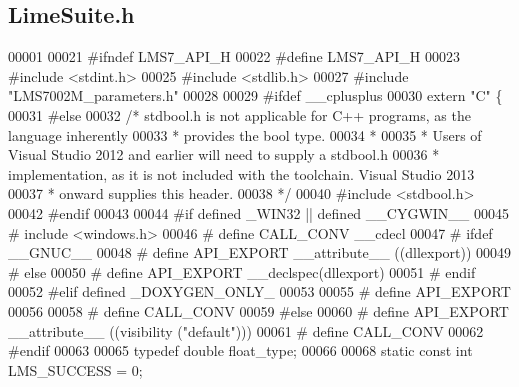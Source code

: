 \subsection{Lime\+Suite.\+h}
\label{LimeSuite_8h_source}

\begin{DoxyCode}
00001 
00021 \textcolor{preprocessor}{#ifndef LMS7\_API\_H}
00022 \textcolor{preprocessor}{#define LMS7\_API\_H}
00023 \textcolor{preprocessor}{#include <stdint.h>}
00025 \textcolor{preprocessor}{#include <stdlib.h>}
00027 \textcolor{preprocessor}{#include "LMS7002M_parameters.h"}
00028 
00029 \textcolor{preprocessor}{#ifdef \_\_cplusplus}
00030 \textcolor{keyword}{extern} \textcolor{stringliteral}{"C"} \{
00031 \textcolor{preprocessor}{#else}
00032 \textcolor{comment}{/* stdbool.h is not applicable for C++ programs, as the language inherently}
00033 \textcolor{comment}{ * provides the bool type.}
00034 \textcolor{comment}{ *}
00035 \textcolor{comment}{ * Users of Visual Studio 2012 and earlier will need to supply a stdbool.h}
00036 \textcolor{comment}{ * implementation, as it is not included with the toolchain. Visual Studio 2013}
00037 \textcolor{comment}{ * onward supplies this header.}
00038 \textcolor{comment}{ */}
00040 \textcolor{preprocessor}{#include <stdbool.h>}
00042 \textcolor{preprocessor}{#endif}
00043 
00044 \textcolor{preprocessor}{#if defined \_WIN32 || defined \_\_CYGWIN\_\_}
00045 \textcolor{preprocessor}{#   include <windows.h>}
00046 \textcolor{preprocessor}{#   define CALL\_CONV \_\_cdecl}
00047 \textcolor{preprocessor}{#   ifdef \_\_GNUC\_\_}
00048 \textcolor{preprocessor}{#       define API\_EXPORT \_\_attribute\_\_ ((dllexport))}
00049 \textcolor{preprocessor}{#   else}
00050 \textcolor{preprocessor}{#       define API\_EXPORT \_\_declspec(dllexport)}
00051 \textcolor{preprocessor}{#   endif}
00052 \textcolor{preprocessor}{#elif defined \_DOXYGEN\_ONLY\_}
00053 
00055 \textcolor{preprocessor}{#   define API\_EXPORT}
00056 
00058 \textcolor{preprocessor}{#   define CALL\_CONV}
00059 \textcolor{preprocessor}{#else}
00060 \textcolor{preprocessor}{#   define API\_EXPORT \_\_attribute\_\_ ((visibility ("default")))}
00061 \textcolor{preprocessor}{#   define CALL\_CONV}
00062 \textcolor{preprocessor}{#endif}
00063 
00065 \textcolor{keyword}{typedef} \textcolor{keywordtype}{double} float_type;
00066 
00068 \textcolor{keyword}{static} \textcolor{keyword}{const} \textcolor{keywordtype}{int} LMS_SUCCESS = 0;

\end{DoxyCode}
